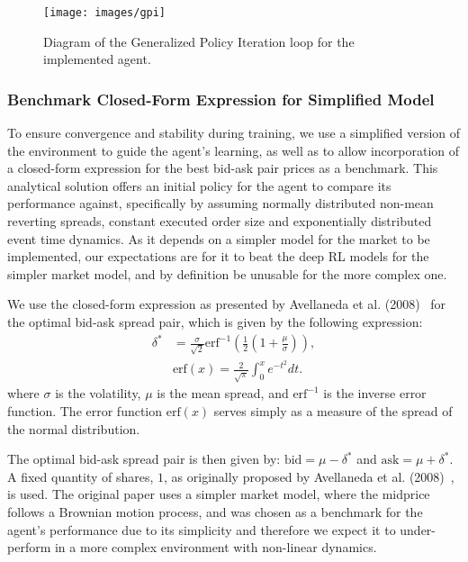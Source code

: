 \begin{figure}
    \centering
    \texttt{[image: images/gpi]}
    \caption{Diagram of the Generalized Policy Iteration loop for the implemented agent.}
    \label{fig:gpi}
\end{figure}

\subsubsection{Benchmark Closed-Form Expression for Simplified Model}
To ensure convergence and stability during training, we use a simplified version of the environment to guide the agent's learning,
as well as to allow incorporation of a closed-form expression for the best bid-ask pair prices as a benchmark.
This analytical solution offers an initial policy for the agent to compare its performance against,
specifically by assuming normally distributed non-mean reverting spreads, constant executed order size and exponentially distributed event time dynamics.
As it depends on a simpler model for the market to be implemented, our expectations are for it to beat the deep RL models for the simpler market model,
and by definition be unusable for the more complex one.

We use the closed-form expression as presented by Avellaneda et al. (2008)~\cite{Avellaneda2008} for the optimal bid-ask spread pair,
which is given by the following expression:
\begin{equation*}
    \begin{aligned}
        \delta^* &= \frac{\sigma}{\sqrt{2}} \text{erf}^{-1} \left( \frac{1}{2} \left( 1 + \frac{\mu}{\sigma} \right) \right),\\
        &\text{erf}(x) = \frac{2}{\sqrt{\pi}} \int_{0}^{x} e^{-t^2} dt.
    \end{aligned}
\end{equation*}
where $\sigma$ is the volatility, $\mu$ is the mean spread, and $\text{erf}^{-1}$ is the inverse error function.
The error function $\text{erf}(x)$ serves simply as a measure of the spread of the normal distribution.

The optimal bid-ask spread pair is then given by: $\text{bid} = \mu - \delta^*$ and $\text{ask} = \mu + \delta^*$.
A fixed quantity of shares, $1$, as originally proposed by Avellaneda et al. (2008)~\cite{Avellaneda2008}, is used.
The original paper uses a simpler market model, where the midprice follows a Brownian motion process,
and was chosen as a benchmark for the agent's performance due to its simplicity and therefore we
expect it to under-perform in a more complex environment with non-linear dynamics.

